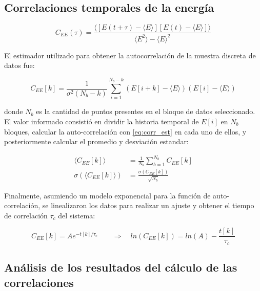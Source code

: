 \documentclass[a4paper,12pt]{article}
\begin{document}
\subsection{Correlaciones temporales de la energía}

\begin{equation}\label{eq:corr_teo}
C_{EE}(\tau) = \frac{\langle \left[E(t+\tau)-\langle 
E\rangle\right]\left[E(t)-\langle E \rangle\right] \rangle
}{\langle E^2\rangle - \langle E \rangle ^2}
\end{equation}

El estimador utilizado para obtener la autocorrelación de la muestra discreta 
de datos fue:

\begin{equation}\label{eq:corr_est}
C_{EE}[k] = \frac{1}{\sigma^2(N_b-k)} \sum_{i=1}^{N_b - k}\left(E[i+k] - 
\langle E \rangle\right)\left(E[i]-\langle E\rangle\right)
\end{equation}

\noindent donde $N_b$ es la cantidad de puntos presentes en el bloque de datos 
seleccionado. El valor informado consistió en dividir la historia temporal de 
$E[i]$ en $N_b$ bloques, calcular la auto-correlación con \eqref{eq:corr_est} 
en cada uno de ellos, y posteriormente calcular el promedio y desviación 
estandar:

\begin{subequations}
\begin{align}
\langle C_{EE}[k]\rangle &= \frac{1}{N_b} \sum_{b=1}^{N_b} C_{EE}[k]\\
\sigma(\langle C_{EE}[k]\rangle) &= \frac{\sigma(C_{EE}[k])}{\sqrt{N_b}}
\end{align}
\end{subequations}

Finalmente, asumiendo un modelo exponencial para la función de 
auto-correlación, se linealizaron los datos para realizar un ajuste y obtener 
el tiempo de correlación $\tau_c$ del sistema:

\begin{equation}
C_{EE}[k]=A e^{-t[k]/\tau_c} \qquad \Rightarrow \quad ln\left(C_{EE}[k]\right) 
= ln(A) - \frac{t[k]}{\tau_c}
\end{equation}

\subsection{Análisis de los resultados del cálculo de las correlaciones}
\end{document}
